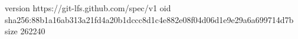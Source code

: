 version https://git-lfs.github.com/spec/v1
oid sha256:88b1a16ab313a21fd4a20b1dccc8d1c4e882e08f04d06d1e9e29a6a699714d7b
size 262240

